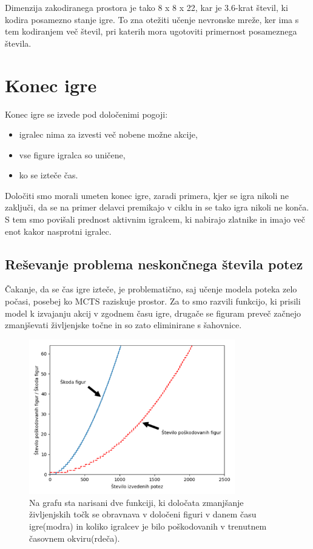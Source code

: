 \documentclass[a4paper, 12pt]{book}
\begin{document}
Dimenzija zakodiranega prostora je tako 8 x 8 x 22, kar je 3.6-krat števil, ki kodira posamezno stanje igre.
To zna otežiti učenje nevronske mreže, ker ima s tem kodiranjem več števil, pri katerih mora ugotoviti primernost posameznega števila.

\section{Konec igre}
\label{sKonecIgre}
Konec igre se izvede pod določenimi pogoji:
\begin{itemize}
	\item igralec nima za izvesti več nobene možne akcije,
	\item vse figure igralca so uničene,
	\item ko se izteče čas.
\end{itemize}

Določiti smo morali umeten konec igre, zaradi primera, kjer se igra nikoli ne zaključi, da se na primer delavci premikajo v ciklu in se tako igra nikoli ne konča.
S tem smo povišali prednost aktivnim igralcem, ki nabirajo zlatnike in imajo več enot kakor nasprotni igralec.

\subsection{Reševanje problema neskončnega števila potez}
\label{sKillFunction}
Čakanje, da se čas igre izteče, je problematično, saj učenje modela poteka zelo počasi, posebej ko MCTS raziskuje prostor.
Za to smo razvili funkcijo, ki prisili model k izvajanju akcij v zgodnem času igre, drugače se figuram preveč začnejo zmanjševati življenjske točne in so zato eliminirane s šahovnice.

\begin{figure}[h!]
	\begin{center}
		\includegraphics[width=0.8\textwidth]{photos/destroy_formula_2018_11_17.pdf}
	\end{center}
	\caption{Na grafu sta narisani dve funkciji, ki določata zmanjšanje življenjskih točk se obravnava v določeni figuri v danem času igre(modra) in koliko igralcev je bilo poškodovanih v trenutnem časovnem okviru(rdeča).}
	\label{destroy_formula_2018_11_17}
\end{figure}
\end{document}
